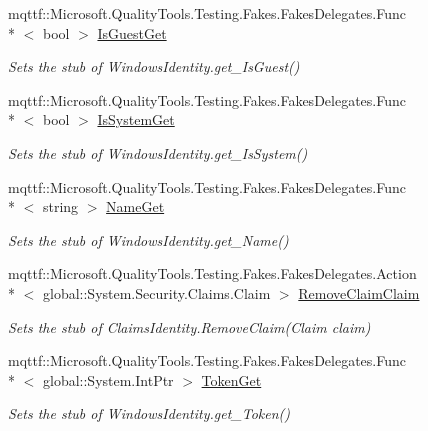 \begin{DoxyCompactItemize}
mqttf\-::\-Microsoft.\-Quality\-Tools.\-Testing.\-Fakes.\-Fakes\-Delegates.\-Func\\*
$<$ bool $>$ \hyperlink{class_system_1_1_security_1_1_principal_1_1_fakes_1_1_stub_windows_identity_ad5e8633bbc1f867b31ffdbf2e64c8952}{Is\-Guest\-Get}
\begin{DoxyCompactList}\small\item\em Sets the stub of Windows\-Identity.\-get\-\_\-\-Is\-Guest()\end{DoxyCompactList}\item 
mqttf\-::\-Microsoft.\-Quality\-Tools.\-Testing.\-Fakes.\-Fakes\-Delegates.\-Func\\*
$<$ bool $>$ \hyperlink{class_system_1_1_security_1_1_principal_1_1_fakes_1_1_stub_windows_identity_a22326a63445ae5ac243856d2f4f8b366}{Is\-System\-Get}
\begin{DoxyCompactList}\small\item\em Sets the stub of Windows\-Identity.\-get\-\_\-\-Is\-System()\end{DoxyCompactList}\item 
mqttf\-::\-Microsoft.\-Quality\-Tools.\-Testing.\-Fakes.\-Fakes\-Delegates.\-Func\\*
$<$ string $>$ \hyperlink{class_system_1_1_security_1_1_principal_1_1_fakes_1_1_stub_windows_identity_a4135db4b71a8293f8742e4933457a470}{Name\-Get}
\begin{DoxyCompactList}\small\item\em Sets the stub of Windows\-Identity.\-get\-\_\-\-Name()\end{DoxyCompactList}\item 
mqttf\-::\-Microsoft.\-Quality\-Tools.\-Testing.\-Fakes.\-Fakes\-Delegates.\-Action\\*
$<$ global\-::\-System.\-Security.\-Claims.\-Claim $>$ \hyperlink{class_system_1_1_security_1_1_principal_1_1_fakes_1_1_stub_windows_identity_a94a637564cb59d06bf093bb389c8509d}{Remove\-Claim\-Claim}
\begin{DoxyCompactList}\small\item\em Sets the stub of Claims\-Identity.\-Remove\-Claim(\-Claim claim)\end{DoxyCompactList}\item 
mqttf\-::\-Microsoft.\-Quality\-Tools.\-Testing.\-Fakes.\-Fakes\-Delegates.\-Func\\*
$<$ global\-::\-System.\-Int\-Ptr $>$ \hyperlink{class_system_1_1_security_1_1_principal_1_1_fakes_1_1_stub_windows_identity_af76e77d02138c855e51a8b430d05980f}{Token\-Get}
\begin{DoxyCompactList}\small\item\em Sets the stub of Windows\-Identity.\-get\-\_\-\-Token()\end{DoxyCompactList}\item 

\end{DoxyCompactItemize}
